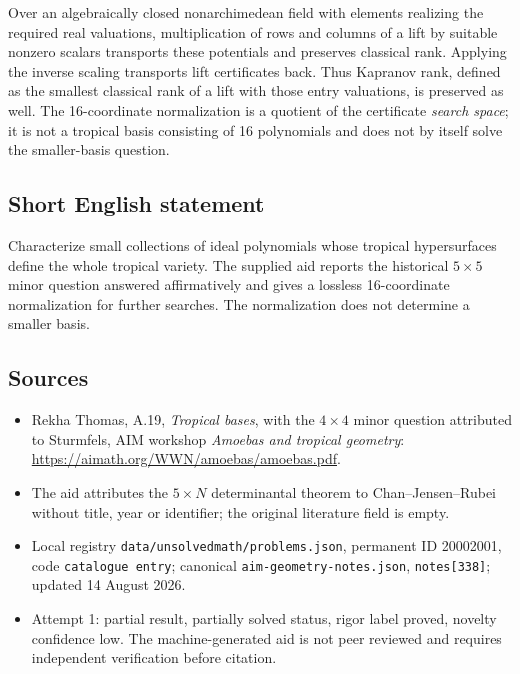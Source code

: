 \documentclass[11pt]{article}
\begin{document}
Over an algebraically closed nonarchimedean field with elements realizing the required real valuations, multiplication of rows and columns of a lift by suitable nonzero scalars transports these potentials and preserves classical rank. Applying the inverse scaling transports lift certificates back. Thus Kapranov rank, defined as the smallest classical rank of a lift with those entry valuations, is preserved as well. The 16-coordinate normalization is a quotient of the certificate \emph{search space}; it is not a tropical basis consisting of 16 polynomials and does not by itself solve the smaller-basis question.
\subsection{Short English statement}
Characterize small collections of ideal polynomials whose tropical hypersurfaces define the whole tropical variety. The supplied aid reports the historical \(5\times5\) minor question answered affirmatively and gives a lossless 16-coordinate normalization for further searches. The normalization does not determine a smaller basis.
\subsection{Sources}
\begin{itemize}
\item Rekha Thomas, A.19, \emph{Tropical bases}, with the \(4\times4\) minor question attributed to Sturmfels, AIM workshop \emph{Amoebas and tropical geometry}: \url{https://aimath.org/WWN/amoebas/amoebas.pdf}.
\item The aid attributes the \(5\times N\) determinantal theorem to Chan--Jensen--Rubei without title, year or identifier; the original literature field is empty.
\item Local registry \texttt{data/unsolvedmath/problems.json}, permanent ID 20002001, code \texttt{catalogue entry}; canonical \texttt{aim-geometry-notes.json}, \texttt{notes[338]}; updated 14 August 2026.
\item Attempt 1: partial result, partially solved status, rigor label proved, novelty confidence low. The machine-generated aid is not peer reviewed and requires independent verification before citation.
\end{itemize}
\end{document}
